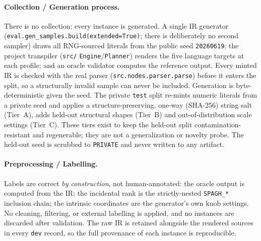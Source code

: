 \paragraph{Collection / Generation process.}
There is no collection: every instance is generated. A single IR generator
(\texttt{eval.gen\_samples.build(extended=True)}; there is deliberately no second
sampler) draws all RNG-sourced literals from the public seed \texttt{20260619}; the
project transpiler (\texttt{src/} \texttt{Engine}/\texttt{Planner}) renders the five
language targets at each profile; and an oracle validator computes the reference
output. Every minted IR is checked with the real parser
(\texttt{src.nodes.parser.parse}) before it enters the split, so a structurally
invalid sample can never be included. Generation is byte-deterministic given the
seed. The private \texttt{test} split re-mints numeric literals from a private seed
and applies a structure-preserving, one-way (SHA-256) string salt (Tier~A),
adds held-out structural shapes (Tier~B) and out-of-distribution scale settings
(Tier~C). These tiers exist to keep the held-out split contamination-resistant and
regenerable; they are not a generalization or novelty probe. The held-out seed is
scrubbed to \texttt{PRIVATE} and never written to any artifact.

\paragraph{Preprocessing / Labelling.}
Labels are correct \emph{by construction}, not human-annotated: the oracle output is
computed from the IR; the incidental rank is the strictly-nested \texttt{SPAGH\_*}
inclusion chain; the intrinsic coordinates are the generator's own knob settings.
No cleaning, filtering, or external labelling is applied, and no instances are
discarded after validation. The raw IR is retained alongside the rendered sources in
every \texttt{dev} record, so the full provenance of each instance is reproducible.

